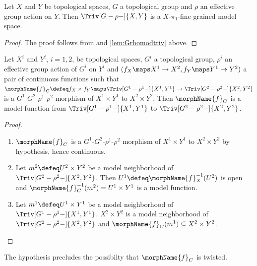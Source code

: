 \documentclass{article}
\begin{document}
\begin{corollary}
\label{cor:Grhomodtriv}
Let $X$ and $Y$ be topological spaces, $G$ a topological group and
$\rho$ an effective group action on $Y$. Then $\Triv[G-\rho-]{X,Y}$ is a
$X$-$\pi_1$-fine grained model space.

\begin{proof}
The proof follows from  and
{
   \showlabelsinline
  \cref{lem:Grhomodtriv}
}
above.
\end{proof}
\end{corollary}

\begin{lemma}
\label{lem:Grhomodtrivmorph}
Let $X^i$ and $Y^i$, $i=1,2$, be topological spaces, $G^i$ a topological
group, $\rho^i$ an effective group action of $G^i$ on $Y^i$ and
\nobreaks
{{
  $(f_X \maps X^1 \to X^2, f_Y \maps Y^1 \to Y^2)$
}}
a pair of continuous functions such that
$
  \morphName{f}_C \defeq f_X \times f_Y \maps
  \Triv[G^1-\rho^1-]{X^1,Y^1} \to \Triv[G^2-\rho^2-]{X^2,Y^2}
$
is a $G^1$-$G^2$-$\rho^1$-$\rho^2$ morphism of $X^1 \times Y^1$ to
$X^2 \times Y^2$,
Then $\morphName{f}_C$ is a model function from
$\Triv[G^1-\rho^1-]{X^1,Y^1}$ to $\Triv[G^2-\rho^2-]{X^2,Y^2}$.
\begin{proof}
\leavevmode
\begin{enumerate}
\item
$\morphName{f}_C$ is a $G^1$-$G^2$-$\rho^1$-$\rho^2$ morphism of
$X^1 \times Y^1$ to $X^2 \times Y^2$ by hypothesis, hence continuous.

\item
Let $m^2 \defeq U^2 \times Y^2$ be a model neighborhood of
$\Triv[G^2-\rho^2-]{X^2,Y^2}$. Then
$U^1 \defeq \morphName{f}_X^{-1}(U^2)$ is open and
$\morphName{f}_C^{-1}(m^2) = U^1 \times Y^1$ is a model function.

\item
Let $m^1 \defeq U^1 \times Y^1$ be a model neighborhood of
$\Triv[G^1-\rho^1-]{X^1,Y^1}$. $X^2 \times Y^2$ is a model neighborhood
of $\Triv[G^2-\rho^2-]{X^2,Y^2}$ and
$\morphName{f}_C(m^1) \subseteq X^2 \times Y^2$.
\end{enumerate}
\end{proof}

\begin{remark}
The hypothesis precludes the possibilty that $\morphName{f}_C$ is
twisted.
\end{remark}
\end{lemma}
\end{document}
